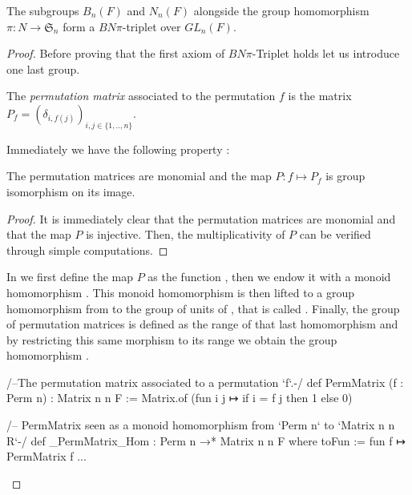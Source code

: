 \begin{theoreme} \label{thm:GL}
    The subgroups $B_n\left( F \right)$ and $N_n\left( F \right)$ alongside the group homomorphism $\pi : N \to \mathfrak{S}_n$ form a $BN\pi$-triplet over $GL_n\left( F \right)$.
\end{theoreme}
\begin{proof}

Before proving that the first axiom of $BN\pi$-Triplet holds let us introduce one last group.
\begin{definition}
    The \emph{permutation matrix} associated to the permutation $f$ is the matrix $P_f = \left( \delta_{i,f(j)} \right)_{i,j \in  \{1,..,n\}}$.
\end{definition}

Immediately we have the following property : 

\begin{propriete} \label{prop:permmat}
    The permutation matrices are monomial and the map $P : f \mapsto P_f$ is group isomorphism on its image.
\end{propriete}

\begin{proof}
    It is immediately clear that the permutation matrices are monomial and that the map $P$ is injective. Then, the multiplicativity of $P$ can be verified through simple computations.
\end{proof}

In \Lean we first define the map $P$ as the function , then we endow it with a monoid homomorphism . This monoid homomorphism is then lifted to a group homomorphism from  to the group of units of , that is  called  . Finally,  the group of permutation matrices is defined as the range of that last homomorphism and by restricting this same morphism to its range we obtain the group homomorphism  .
\begin{leancode}
/--The permutation matrix associated to a permutation `f`.-/
def PermMatrix (f : Perm n) : Matrix n n F := 
    Matrix.of (fun i j ↦ if i = f j then 1 else 0)

 /-- PermMatrix seen as a monoid homomorphism from `Perm n` to `Matrix n n R`-/
def _PermMatrix_Hom : Perm n →* Matrix n n F where
  toFun := fun f ↦ PermMatrix f
  ...


\end{leancode}
\end{proof}
